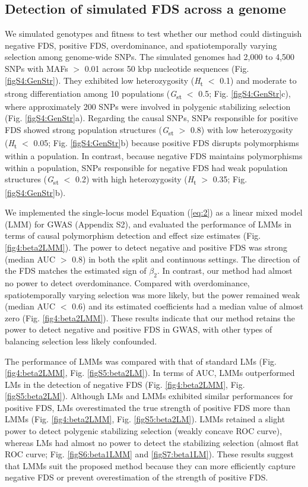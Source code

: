 \documentclass[12pt,]{article}
\begin{document}
\subsection{Detection of simulated FDS across a genome}
We simulated genotypes and fitness to test whether our method could distinguish negative FDS, positive FDS, overdominance, and spatiotemporally varying selection among genome-wide SNPs. The simulated genomes had 2,000 to 4,500 SNPs with MAFs $>$ 0.01 across 50 kbp nucleotide sequences (Fig. \ref{figS4:GenStr}). They exhibited low heterozygosity (\textit{H}\textsubscript{t} $<$ 0.1) and moderate to strong differentiation among 10 populations (\textit{G}\textsubscript{st} $<$ 0.5; Fig. \ref{figS4:GenStr}c), where approximately 200 SNPs were involved in polygenic stabilizing selection (Fig. \ref{figS4:GenStr}a). Regarding the causal SNPs, SNPs responsible for positive FDS showed strong population structures (\textit{G}\textsubscript{st} $>$ 0.8) with low heterozygosity (\textit{H}\textsubscript{t} $<$ 0.05; Fig. \ref{figS4:GenStr}b) because positive FDS disrupts polymorphisms within a population. In contrast, because negative FDS maintains polymorphisms within a population, SNPs responsible for negative FDS had weak population structures (\textit{G}\textsubscript{st} $<$ 0.2) with high heterozygosity (\textit{H}\textsubscript{t} $>$ 0.35; Fig. \ref{figS4:GenStr}b).

We implemented the single-locus model Equation (\ref{eq:2}) as a linear mixed model (LMM) for GWAS (Appendix S2), and evaluated the performance of LMMs in terms of causal polymorphism detection and effect size estimates (Fig. \ref{fig4:beta2LMM}). The power to detect negative and positive FDS was strong (median AUC $>$ 0.8) in both the split and continuous settings. The direction of the FDS matches the estimated sign of $\beta_2$. In contrast, our method had almost no power to detect overdominance. Compared with overdominance, spatiotemporally varying selection was more likely, but the power remained weak (median AUC $<$ 0.6) and its estimated coefficients had a median value of almost zero (Fig. \ref{fig4:beta2LMM}). These results indicate that our method retains the power to detect negative and positive FDS in GWAS, with other types of balancing selection less likely confounded. 

The performance of LMMs was compared with that of standard LMs (Fig. \ref{fig4:beta2LMM}, Fig. \ref{figS5:beta2LM}). In terms of AUC, LMMs outperformed LMs in the detection of negative FDS (Fig. \ref{fig4:beta2LMM}, Fig. \ref{figS5:beta2LM}). Although LMs and LMMs exhibited similar performances for positive FDS, LMs overestimated the true strength of positive FDS more than LMMs (Fig. \ref{fig4:beta2LMM}, Fig. \ref{figS5:beta2LM}). LMMs retained a slight power to detect polygenic stabilizing selection (weakly concave ROC curve), whereas LMs had almost no power to detect the stabilizing selection (almost flat ROC curve; Fig. \ref{figS6:beta1LMM} and \ref{figS7:beta1LM}). These results suggest that LMMs suit the proposed method because they can more efficiently capture negative FDS or prevent overestimation of the strength of positive FDS.
\end{document}
